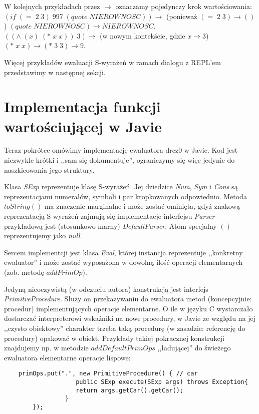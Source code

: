 \documentclass[a4paper]{article}
\begin{document}
W kolejnych przykładach przez $\rightarrow$ oznaczamy pojedynczy krok wartościowania:\\

$(if \; (=\; 2 \;3)\; 997\; (quote\; NIEROWNOSC)) \rightarrow $ (ponieważ $(=\; 2\; 3) \rightarrow ()$)
$(quote\; NIEROWNOSC) \rightarrow NIEROWNOSC$. \\

$((\wedge \;(x)\; (*\; x\; x))\; 3) \rightarrow $ (w nowym kontekście, gdzie $x \rightarrow 3$)
$ (*\; x\; x) \rightarrow (*\; 3\; 3) \rightarrow 9$.

Więcej przykładów ewaluacji S-wyrażeń w ramach dialogu z REPL'em przedstawimy w następnej sekcji.


\section{Implementacja funkcji wartościującej w Javie}

Teraz pokrótce omówimy implementację ewaluatora drcz0 w Javie. Kod jest niezwykle krótki i ,,sam się
dokumentuje'', ograniczymy się więc jedynie do naszkicowania jego struktury.

Klasa \emph{SExp} reprezentuje klasę S-wyrażeń. Jej dziedzice \emph{Num}, \emph{Sym} i \emph{Cons} są
reprezentacjami numerałów, symboli i par kropkowanych odpowiednio. Metoda $toString()$ ma znaczenie
marginalne i może zostać ominięta, gdyż znakową reprezentacją S-wyrażeń zajmują się implementacje
interfejsu \emph{Parser} - przykładową jest (stosunkowo marny) \emph{DefaultParser}.
Atom specjalny $()$ reprezentujemy jako \emph{null}.

Sercem implementcji jest klasa \emph{Eval}, której instancja reprezentuje ,,konkretny ewaluator''
i może zostać wyposażona w dowolną ilość operacji elementarnych (zob. metodę $addPrimOp$).

Jedyną nieoczywistą (w odczuciu autora) konstrukcją jest interfejs \emph{PrimitveProcedure}.
Służy on przekazywaniu do ewaluatora metod (koncepcyjnie: procedur) implementujących operacje
elementarne. O ile w języku C wystarczało dostarczać interpreterowi wskaźniki na nowe
procedury, w Javie ze względu na jej ,,czysto obiektowy'' charakter trzeba taką procedurę
(w zasadzie: referencję do procedury) opakować w obiekt. Przykłady takiej pokracznej konstrukcji
znajdujemy np. w metodzie $addDefaultPrimOps$ ,,ładującej'' do świeżego ewaluatora elementarne
operacje lispowe:

\begin{verbatim}
	primOps.put(".", new PrimitiveProcedure() { // car
                    public SExp execute(SExp args) throws Exception{
                    return args.getCar().getCar();
                 }
	    });
\end{verbatim}
\end{document}
